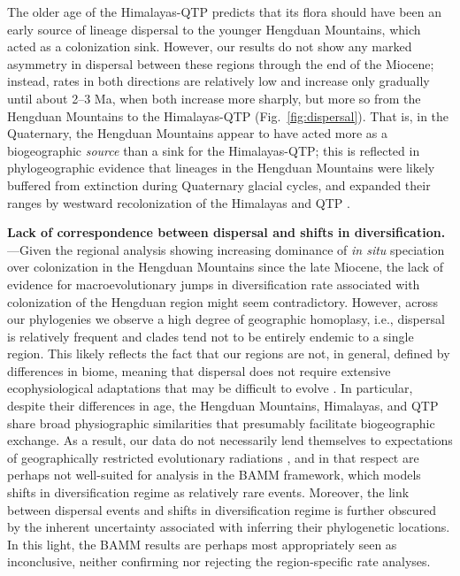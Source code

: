 
The older age of the Himalayas-QTP predicts that its flora should have been an early source of lineage dispersal to the younger Hengduan Mountains, which acted as a colonization sink. However, our results do not show any marked asymmetry in dispersal between these regions through the end of the Miocene; instead, rates in both directions are relatively low and increase only gradually until about 2--3 Ma, when both increase more sharply, but more so from the Hengduan Mountains to the Himalayas-QTP (Fig.~\ref{fig:dispersal}). That is, in the Quaternary, the Hengduan Mountains appear to have acted more as a biogeographic \textit{source} than a sink for the Himalayas-QTP; this is reflected in phylogeographic evidence that lineages in the Hengduan Mountains were likely buffered from extinction during Quaternary glacial cycles, and expanded their ranges by westward recolonization of the Himalayas and QTP \citep[e.g.,][]{WangBS2011,CunY2010}. 


\textbf{Lack of correspondence between dispersal and shifts in diversification.}---Given the regional analysis showing increasing dominance of \textit{in situ} speciation over colonization in the Hengduan Mountains since the late Miocene, the lack of evidence for macroevolutionary jumps in diversification rate  associated with colonization of the Hengduan region might seem contradictory. However, across our phylogenies we observe a high degree of geographic homoplasy, i.e., dispersal is relatively frequent and clades tend not to be entirely endemic to a single region. This likely reflects the fact that our regions are not, in general, defined by differences in biome, meaning that dispersal does not require extensive ecophysiological adaptations that may be difficult to evolve \citep{Donoghue2014}. In particular, despite their differences in age, the Hengduan Mountains, Himalayas, and QTP share broad physiographic similarities that presumably facilitate biogeographic exchange. As a result, our data do not necessarily lend themselves to expectations of geographically restricted evolutionary radiations \citep[e.g.][]{Hughes2006}, and in that respect are perhaps not well-suited for analysis in the BAMM framework, which models shifts in diversification regime as relatively rare events. Moreover, the link between dispersal events and shifts in diversification regime is further obscured by the inherent uncertainty associated with inferring their phylogenetic locations. In this light, the BAMM results are perhaps most appropriately seen as inconclusive, neither confirming nor rejecting the region-specific rate analyses.

